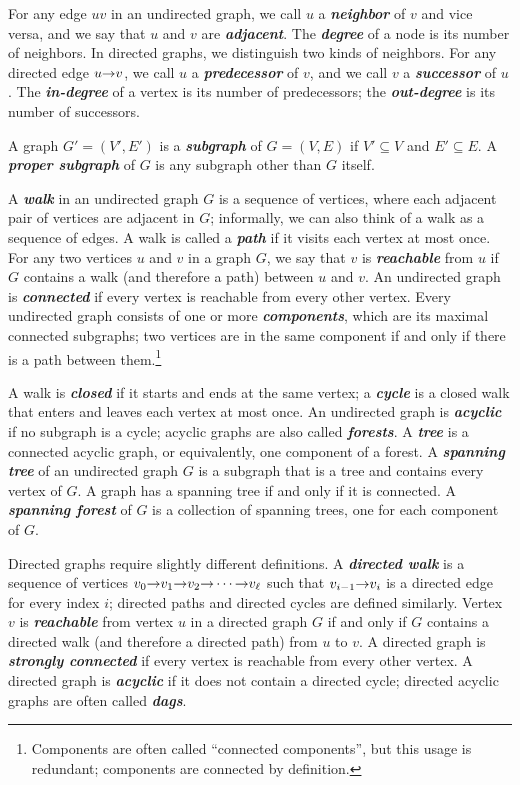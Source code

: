 For any edge $uv$ in an undirected graph, we call $u$ a \textbf{\textit{neighbor}} of $v$ and vice versa, and we say that $u$ and $v$ are \textbf{\textit{adjacent}}.
The \textbf{\textit{degree}} of a node is its number of neighbors.
In directed graphs, we distinguish two kinds of neighbors.
For any directed edge $u\mathord{\rightarrow}v$, we call $u$ a \textbf{\textit{predecessor}} of $v$, and we call $v$ a \textbf{\textit{successor}} of $u$.
The \textbf{\textit{in-degree}} of a vertex is its number of predecessors; the \textbf{\textit{out-degree}} is its number of successors.

A graph $G' = (V', E')$ is a \textbf{\textit{subgraph}} of $G = (V, E)$ if $V' \subseteq V$ and $E' \subseteq E$.
A \textbf{\textit{proper subgraph}} of $G$ is any subgraph other than $G$ itself.

A \textbf{\textit{walk}} in an undirected graph $G$ is a sequence of vertices, where each adjacent pair of vertices are adjacent in $G$; informally, we can also think of a walk as a sequence of edges.
A walk is called a \textbf{\textit{path}} if it visits each vertex at most once.
For any two vertices $u$ and $v$ in a graph $G$, we say that $v$ is \textbf{\textit{reachable}} from $u$ if $G$ contains a walk (and therefore a path) between $u$ and $v$.
An undirected graph is \textbf{\textit{connected}} if every vertex is reachable from every other vertex.
Every undirected graph consists of one or more \textbf{\textit{components}}, which are its maximal connected subgraphs; two vertices are in the same component if and only if there is a path between them.\footnote{Components are often called “connected components”, but this usage is redundant; components are connected by definition.}

A walk is \textbf{\textit{closed}} if it starts and ends at the same vertex; a \textbf{\textit{cycle}} is a closed walk that enters and leaves each vertex at most once.
An undirected graph is \textbf{\textit{acyclic}} if no subgraph is a cycle; acyclic graphs are also called \textbf{\textit{forests}}.
A \textbf{\textit{tree}} is a connected acyclic graph, or equivalently, one component of a forest.
A \textbf{\textit{spanning tree}} of an undirected graph $G$ is a subgraph that is a tree and contains every vertex of $G$.
A graph has a spanning tree if and only if it is connected.
A \textbf{\textit{spanning forest}} of $G$ is a collection of spanning trees, one for each component of $G$.

Directed graphs require slightly different definitions.
A \textbf{\textit{directed walk}} is a sequence of vertices $v_0\mathord{\rightarrow}v_1\mathord{\rightarrow}v_2\mathord{\rightarrow}\cdots\mathord{\rightarrow}v_\ell$ such that $v_{i-1}\mathord{\rightarrow}v_i$ is a directed edge for every index $i$; directed paths and directed cycles are defined similarly.
Vertex $v$ is \textbf{\textit{reachable}} from vertex $u$ in a directed graph $G$ if and only if $G$ contains a directed walk (and therefore a directed path) from $u$ to $v$.
A directed graph is \textbf{\textit{strongly connected}} if every vertex is reachable from every other vertex.
A directed graph is \textbf{\textit{acyclic}} if it does not contain a directed cycle; directed acyclic graphs are often called \textbf{\textit{dags}}.


